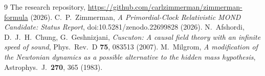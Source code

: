 \documentclass[11pt,letterpaper]{article}
\begin{document}
\begin{thebibliography}{9}
 The research repository, \url{https://github.com/carlzimmerman/zimmerman-formula} (2026).
 C.~P.~Zimmerman, \emph{A Primordial-Clock Relativistic MOND Candidate: Status Report}, doi:10.5281/zenodo.22699828 (2026).
 N.~Afshordi, D.~J.~H.~Chung, G.~Geshnizjani, \emph{Cuscuton: A causal field theory with an infinite speed of sound}, Phys.\ Rev.\ D \textbf{75}, 083513 (2007).
 M.~Milgrom, \emph{A modification of the Newtonian dynamics as a possible alternative to the hidden mass hypothesis}, Astrophys.\ J.\ \textbf{270}, 365 (1983).
\end{thebibliography}
\end{document}
